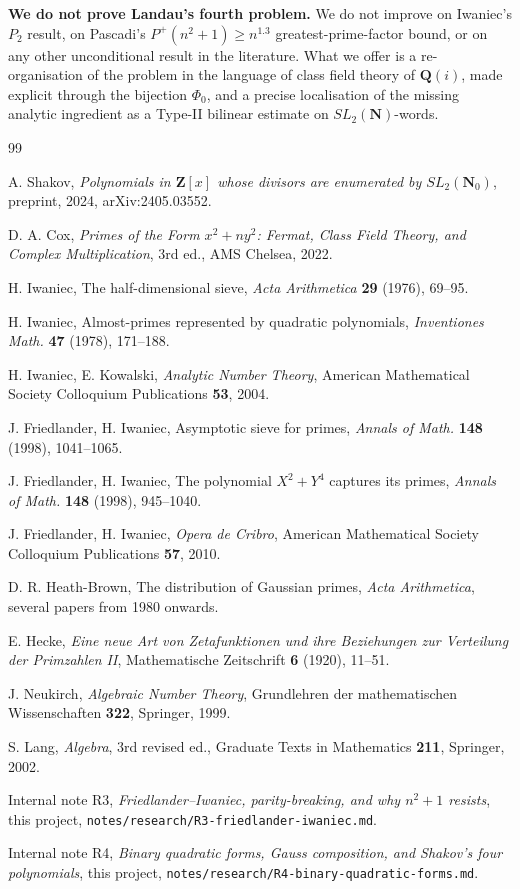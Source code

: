 \documentclass[11pt]{article}
\theoremstyle{definition}
\newcommand{\N}{\mathbf{N}}
\newcommand{\Nz}{\mathbf{N}_0}
\newcommand{\Z}{\mathbf{Z}}
\newcommand{\Q}{\mathbf{Q}}
\newcommand{\SLNz}{SL_2(\Nz)}
\newcommand{\SLN}{SL_2(\N)}
\begin{document}
\textbf{We do not prove Landau's fourth problem.} We do not improve on Iwaniec's $P_2$
result, on Pascadi's $P^+(n^2+1) \ge n^{1.3}$ greatest-prime-factor bound, or on any
other unconditional result in the literature. What we offer is a re-organisation of the
problem in the language of class field theory of $\Q(i)$, made explicit through the
bijection $\Phi_0$, and a precise localisation of the missing analytic ingredient as a
Type-II bilinear estimate on $\SLN$-words.

\begin{thebibliography}{99}

 A. Shakov,
\emph{Polynomials in $\Z[x]$ whose divisors are enumerated by $\SLNz$},
preprint, 2024, arXiv:2405.03552.

 D. A. Cox,
\emph{Primes of the Form $x^2 + ny^2$: Fermat, Class Field Theory, and Complex
Multiplication}, 3rd ed., AMS Chelsea, 2022.

 H. Iwaniec,
The half-dimensional sieve, \emph{Acta Arithmetica} \textbf{29} (1976), 69--95.

 H. Iwaniec,
Almost-primes represented by quadratic polynomials,
\emph{Inventiones Math.} \textbf{47} (1978), 171--188.

 H. Iwaniec, E. Kowalski,
\emph{Analytic Number Theory},
American Mathematical Society Colloquium Publications \textbf{53}, 2004.

 J. Friedlander, H. Iwaniec,
Asymptotic sieve for primes,
\emph{Annals of Math.} \textbf{148} (1998), 1041--1065.

 J. Friedlander, H. Iwaniec,
The polynomial $X^2 + Y^4$ captures its primes,
\emph{Annals of Math.} \textbf{148} (1998), 945--1040.

 J. Friedlander, H. Iwaniec,
\emph{Opera de Cribro},
American Mathematical Society Colloquium Publications \textbf{57}, 2010.

 D. R. Heath-Brown,
The distribution of Gaussian primes,
\emph{Acta Arithmetica}, several papers from 1980 onwards.

 E. Hecke,
\emph{Eine neue Art von Zetafunktionen und ihre Beziehungen zur Verteilung der
Primzahlen II},
Mathematische Zeitschrift \textbf{6} (1920), 11--51.

 J. Neukirch,
\emph{Algebraic Number Theory},
Grundlehren der mathematischen Wissenschaften \textbf{322}, Springer, 1999.

 S. Lang,
\emph{Algebra}, 3rd revised ed., Graduate Texts in Mathematics \textbf{211}, Springer,
2002.

Internal note R3, \emph{Friedlander--Iwaniec, parity-breaking, and why $n^2+1$ resists},
this project, \texttt{notes/research/R3-friedlander-iwaniec.md}.

Internal note R4, \emph{Binary quadratic forms, Gauss composition, and Shakov's four
polynomials}, this project, \texttt{notes/research/R4-binary-quadratic-forms.md}.

\end{thebibliography}
\end{document}
